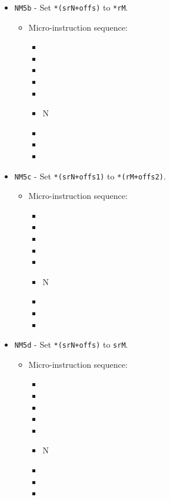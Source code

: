 \documentclass{article}
\begin{document}
\begin{itemize}
    \item \Verb|NM5b| - Set \Verb|*(srN+offs)| to \Verb|*rM|.
    \begin{itemize}
        \item Micro-instruction sequence:
        \begin{itemize}
            \item \pkptroutinc
            \item \datatooffs
            \item \incrementpk
            \item \pkptroutinc
            \item \holddata
            \item \specialtoaddr N
            \item \writeRAMo
            \item \incrementpk
            \item \done
        \end{itemize}
    \end{itemize}
    
    \item \Verb|NM5c| - Set \Verb|*(srN+offs1)| to \Verb|*(rM+offs2)|.
    \begin{itemize}
        \item Micro-instruction sequence:
        \begin{itemize}
            \item \pkptroutinc
            \item \datatooffs
            \item \incrementpk
            \item \pkptroutinc
            \item \holddata
            \item \specialtoaddr N
            \item \writeRAMo
            \item \incrementpk
            \item \done
        \end{itemize}
    \end{itemize}

    \item \Verb|NM5d| - Set \Verb|*(srN+offs)| to \Verb|srM|.
    \begin{itemize}
        \item Micro-instruction sequence:
        \begin{itemize}
            \item \pkptroutinc
            \item \datatooffs
            \item \incrementpk
            \item \pkptroutinc
            \item \holddata
            \item \specialtoaddr N
            \item \writeRAMo
            \item \incrementpk
            \item \done
        \end{itemize}
    \end{itemize}
    

\end{itemize}
\end{document}
